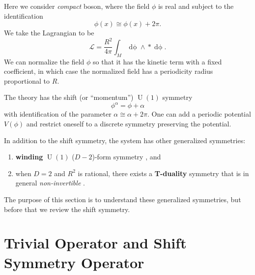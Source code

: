\documentclass[
  letterpaper,
  DIV=11,
  numbers=noendperiod]{scrreport}
\providecommand{\tightlist}{%
  \setlength{\itemsep}{0pt}\setlength{\parskip}{0pt}}\usepackage{longtable,booktabs,array}
\DeclareMathOperator{\U}{U}
\newcommand{\stdim}{D}
\begin{document}
Here we consider \emph{compact} boson, where the field \(\phi\) is real
and subject to the identification \[
\phi(x) \cong \phi(x) + 2\pi.
\] We take the Lagrangian to be \[
\mathcal{L} = \frac{R^2}{4\pi}\int_M \mathop{d\phi} \wedge \mathop{*}\mathop{d\phi}.
\] We can normalize the field \(\phi\) so that it has the kinetic term
with a fixed coefficient, in which case the normalized field has a
periodicity radius proportional to \(R\).

The theory has the shift (or ``momentum'') \(\U(1)\) symmetry \[
\phi^\alpha = \phi + \alpha 
\] with identification of the parameter \(\alpha \cong \alpha + 2\pi\).
One can add a periodic potential \(V(\phi)\) and restrict oneself to a
discrete symmetry preserving the potential.

In addition to the shift symmetry, the system has other generalized
symmetries:

\begin{enumerate}
\def\labelenumi{\arabic{enumi}.}
\tightlist
\item
  \textbf{winding} \(\U(1)\) (\(\stdim-2\))-form symmetry
  \autocite{Gaiotto:2014kfa}, and
\item
  when \(\stdim=2\) and \(R^2\) is rational, there exists a
  \textbf{T-duality} symmetry that is in general \emph{non-invertible}
  \autocites{Choi:2021kmx}{Niro:2022ctq}{Cordova:2023ent,Nagoya:2023zky}.
\end{enumerate}

The purpose of this section is to understand these generalized
symmetries, but before that we review the shift symmetry.

\section{Trivial Operator and Shift Symmetry
Operator}\label{trivial-operator-and-shift-symmetry-operator}
\end{document}
